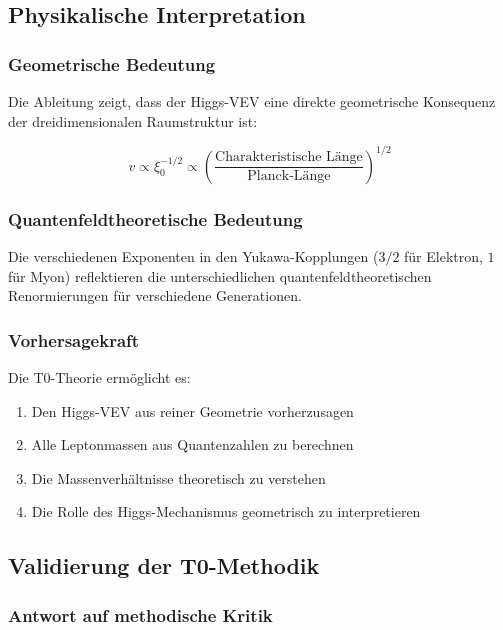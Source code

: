 \subsection{Physikalische Interpretation}

\subsubsection{Geometrische Bedeutung}

Die Ableitung zeigt, dass der Higgs-VEV eine direkte geometrische Konsequenz der dreidimensionalen Raumstruktur ist:

\begin{equation}
	v \propto \xi_0^{-1/2} \propto \left(\frac{\text{Charakteristische Länge}}{\text{Planck-Länge}}\right)^{1/2}
\end{equation}

\subsubsection{Quantenfeldtheoretische Bedeutung}

Die verschiedenen Exponenten in den Yukawa-Kopplungen ($3/2$ für Elektron, $1$ für Myon) reflektieren die unterschiedlichen quantenfeldtheoretischen Renormierungen für verschiedene Generationen.

\subsubsection{Vorhersagekraft}

Die T0-Theorie ermöglicht es:

\begin{enumerate}
	\item Den Higgs-VEV aus reiner Geometrie vorherzusagen
	\item Alle Leptonmassen aus Quantenzahlen zu berechnen
	\item Die Massenverhältnisse theoretisch zu verstehen
	\item Die Rolle des Higgs-Mechanismus geometrisch zu interpretieren
\end{enumerate}

\subsection{Validierung der T0-Methodik}

\subsubsection{Antwort auf methodische Kritik}


